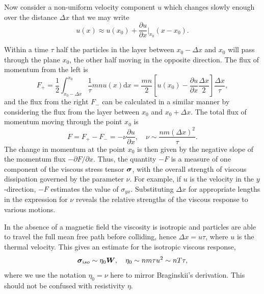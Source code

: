 Now consider a non-uniform velocity component $u$ which changes slowly enough over the distance $\Delta x$ that we may write
\begin{equation}
  \label{eq:viscous_derivation_vy}
u (x) \approx u(x_0) + \frac{\partial u}{\partial x} \bigg| _{x_0} (x - x_0).
\end{equation}

Within a time $\tau$ half the particles in the layer between $x_0 - \Delta x$ and $x_0$ will pass through the plane $x_0$, the other half moving in the opposite direction. The flux of momentum from the left is
\begin{equation}
  \label{eq:momentum_flux_left}
F_{+} = \frac{1}{2} \int^{x_0}_{x_0 - \Delta x} \frac{1}{\tau} m n u(x) \text{d}x = \frac{mn}{2} \left[ u(x_0) - \frac{\partial u}{\partial x} \frac{\Delta x}{2} \right] \frac{\Delta x}{\tau},
\end{equation}
and the flux from the right $F_{-}$ can be calculated in a similar manner by considering the flux from the layer between $x_0$ and $x_0 + \Delta x$. The total flux of momentum moving through the point $x_0$ is
\begin{equation}
  \label{eq:total_momentum_flux}
  F = F_+ - F_- = - \nu \frac{\partial u}{\partial x}, \quad \nu \sim \frac{nm(\Delta x)^2}{\tau}.
\end{equation}
The change in momentum at the point $x_0$ is then given by the negative slope of the momentum flux $- \partial F/\partial x$. Thus, the quantity $-F$ is a measure of one component of the viscous stress tensor ${\bm \sigma}$, with the overall strength of viscous dissipation governed by the parameter $\nu$. For example, if $u$ is the velocity in the $y$-direction, $-F$ estimates the value of $\sigma_{yx}$. Substituting $\Delta x$ for appropriate lengths in the expression for $\nu$ reveals the relative strengths of the viscous response to various motions. 

In the absence of a magnetic field the viscosity is isotropic and particles are able to travel the full mean free path before colliding, hence $\Delta x = u \tau$, where $u$ is the thermal velocity. This gives an estimate for the isotropic viscous response,
\begin{equation}
  \label{eq:isotropic_eta_estimate}
  {\bm \sigma}_{iso} \sim \eta_0 {\bm W}, \quad \eta_0 \sim nm\tau u^2 \sim nT \tau,
\end{equation}
where we use the notation $\eta_0 = \nu$ here to mirror Braginskii's derivation. This should not be confused with resistivity $\eta$.

